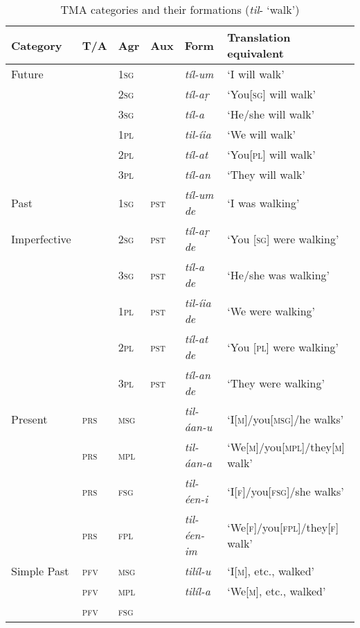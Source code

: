 \begin{table}[ht]
\caption{TMA categories and their formations (\textit{til}- `walk')}
\begin{tabularx}{\textwidth}{ l l l l l l }
\lsptoprule
Category &
T/A &
Agr &
Aux &
Form &
Translation equivalent\\\hline
Future &
&
\textsc{1sg} &
&
\textit{tíl-um} &
`I will walk' \\
&
&
\textsc{2sg} &
&
\textit{tíl-aṛ} &
`You[\textsc{sg}] will walk' \\
&
&
\textsc{3sg} &
&
\textit{tíl-a} &
`He/she will walk' \\
&
&
\textsc{1pl} &
&
\textit{til-íia} &
`We will walk' \\
&
&
\textsc{2pl} &
&
\textit{tíl-at} &
`You[\textsc{pl}] will walk' \\
&
&
\textsc{3pl} &
&
\textit{tíl-an} &
`They will walk' \\
Past &
&
\textsc{1sg} &
\textsc{pst} &
\textit{tíl-um de} &
`I was walking' \\
Imperfective &
&
\textsc{2sg} &
\textsc{pst} &
\textit{tíl-aṛ de} &
`You [\textsc{sg}] were walking' \\
&
&
\textsc{3sg} &
\textsc{pst} &
\textit{tíl-a de} &
`He/she was walking' \\
&
&
\textsc{1pl} &
\textsc{pst} &
\textit{til-íia de} &
`We were walking' \\
&
&
\textsc{2pl} &
\textsc{pst} &
\textit{tíl-at de} &
`You [\textsc{pl}] were walking' \\
&
&
\textsc{3pl} &
\textsc{pst} &
\textit{tíl-an de} &
`They were walking' \\
Present &
\textsc{prs} &
\textsc{msg} &
&
\textit{til-áan-u} &
`I[\textsc{m}]/you[\textsc{msg}]/he walks' \\
&
\textsc{prs} &
\textsc{mpl} &
&
\textit{til-áan-a} &
`We[\textsc{m}]/you[\textsc{mpl}]/they[\textsc{m}] walk' \\
&
\textsc{prs} &
\textsc{fsg} &
&
\textit{til-éen-i} &
`I[\textsc{f}]/you[\textsc{fsg}]/she walks' \\
&
\textsc{prs} &
\textsc{fpl} &
&
\textit{til-éen-im} &
`We[\textsc{f}]/you[\textsc{fpl}]/they[\textsc{f}] walk' \\
Simple Past &
\textsc{pfv} &
\textsc{msg} &
&
\textit{tilíl-u} &
`I[\textsc{m}], etc., walked' \\
&
\textsc{pfv} &
\textsc{mpl} &
&
\textit{tilíl-a} &
`We[\textsc{m}], etc., walked' \\
&
\textsc{pfv} &
\textsc{fsg} &
&

\end{tabularx}
\end{table}
